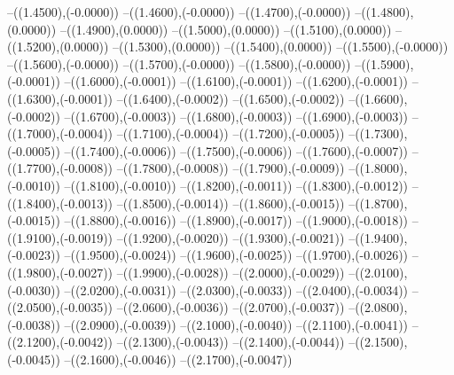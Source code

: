 {	--({\sx*(1.4500)},{\sy*(-0.0000)})
	--({\sx*(1.4600)},{\sy*(-0.0000)})
	--({\sx*(1.4700)},{\sy*(-0.0000)})
	--({\sx*(1.4800)},{\sy*(0.0000)})
	--({\sx*(1.4900)},{\sy*(0.0000)})
	--({\sx*(1.5000)},{\sy*(0.0000)})
	--({\sx*(1.5100)},{\sy*(0.0000)})
	--({\sx*(1.5200)},{\sy*(0.0000)})
	--({\sx*(1.5300)},{\sy*(0.0000)})
	--({\sx*(1.5400)},{\sy*(0.0000)})
	--({\sx*(1.5500)},{\sy*(-0.0000)})
	--({\sx*(1.5600)},{\sy*(-0.0000)})
	--({\sx*(1.5700)},{\sy*(-0.0000)})
	--({\sx*(1.5800)},{\sy*(-0.0000)})
	--({\sx*(1.5900)},{\sy*(-0.0001)})
	--({\sx*(1.6000)},{\sy*(-0.0001)})
	--({\sx*(1.6100)},{\sy*(-0.0001)})
	--({\sx*(1.6200)},{\sy*(-0.0001)})
	--({\sx*(1.6300)},{\sy*(-0.0001)})
	--({\sx*(1.6400)},{\sy*(-0.0002)})
	--({\sx*(1.6500)},{\sy*(-0.0002)})
	--({\sx*(1.6600)},{\sy*(-0.0002)})
	--({\sx*(1.6700)},{\sy*(-0.0003)})
	--({\sx*(1.6800)},{\sy*(-0.0003)})
	--({\sx*(1.6900)},{\sy*(-0.0003)})
	--({\sx*(1.7000)},{\sy*(-0.0004)})
	--({\sx*(1.7100)},{\sy*(-0.0004)})
	--({\sx*(1.7200)},{\sy*(-0.0005)})
	--({\sx*(1.7300)},{\sy*(-0.0005)})
	--({\sx*(1.7400)},{\sy*(-0.0006)})
	--({\sx*(1.7500)},{\sy*(-0.0006)})
	--({\sx*(1.7600)},{\sy*(-0.0007)})
	--({\sx*(1.7700)},{\sy*(-0.0008)})
	--({\sx*(1.7800)},{\sy*(-0.0008)})
	--({\sx*(1.7900)},{\sy*(-0.0009)})
	--({\sx*(1.8000)},{\sy*(-0.0010)})
	--({\sx*(1.8100)},{\sy*(-0.0010)})
	--({\sx*(1.8200)},{\sy*(-0.0011)})
	--({\sx*(1.8300)},{\sy*(-0.0012)})
	--({\sx*(1.8400)},{\sy*(-0.0013)})
	--({\sx*(1.8500)},{\sy*(-0.0014)})
	--({\sx*(1.8600)},{\sy*(-0.0015)})
	--({\sx*(1.8700)},{\sy*(-0.0015)})
	--({\sx*(1.8800)},{\sy*(-0.0016)})
	--({\sx*(1.8900)},{\sy*(-0.0017)})
	--({\sx*(1.9000)},{\sy*(-0.0018)})
	--({\sx*(1.9100)},{\sy*(-0.0019)})
	--({\sx*(1.9200)},{\sy*(-0.0020)})
	--({\sx*(1.9300)},{\sy*(-0.0021)})
	--({\sx*(1.9400)},{\sy*(-0.0023)})
	--({\sx*(1.9500)},{\sy*(-0.0024)})
	--({\sx*(1.9600)},{\sy*(-0.0025)})
	--({\sx*(1.9700)},{\sy*(-0.0026)})
	--({\sx*(1.9800)},{\sy*(-0.0027)})
	--({\sx*(1.9900)},{\sy*(-0.0028)})
	--({\sx*(2.0000)},{\sy*(-0.0029)})
	--({\sx*(2.0100)},{\sy*(-0.0030)})
	--({\sx*(2.0200)},{\sy*(-0.0031)})
	--({\sx*(2.0300)},{\sy*(-0.0033)})
	--({\sx*(2.0400)},{\sy*(-0.0034)})
	--({\sx*(2.0500)},{\sy*(-0.0035)})
	--({\sx*(2.0600)},{\sy*(-0.0036)})
	--({\sx*(2.0700)},{\sy*(-0.0037)})
	--({\sx*(2.0800)},{\sy*(-0.0038)})
	--({\sx*(2.0900)},{\sy*(-0.0039)})
	--({\sx*(2.1000)},{\sy*(-0.0040)})
	--({\sx*(2.1100)},{\sy*(-0.0041)})
	--({\sx*(2.1200)},{\sy*(-0.0042)})
	--({\sx*(2.1300)},{\sy*(-0.0043)})
	--({\sx*(2.1400)},{\sy*(-0.0044)})
	--({\sx*(2.1500)},{\sy*(-0.0045)})
	--({\sx*(2.1600)},{\sy*(-0.0046)})
	--({\sx*(2.1700)},{\sy*(-0.0047)})
}
